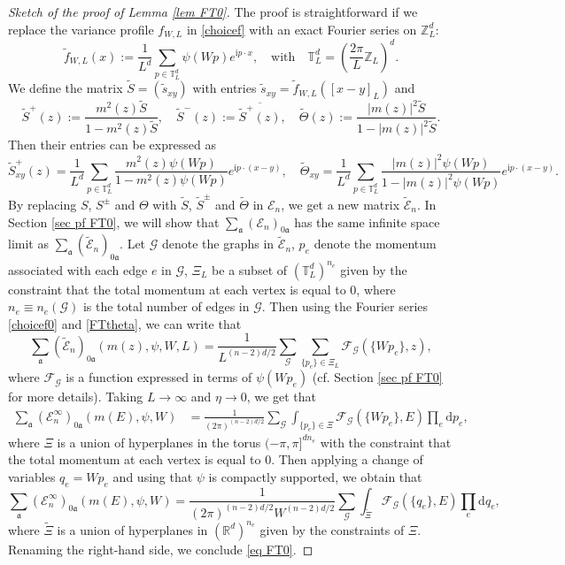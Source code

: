 \documentclass{article}
\newcommand{\1}{\mathds{1}}
\numberwithin{equation}{section}
\newcommand{\be}{\begin{equation}}
\newcommand{\ee}{\end{equation}}
\newcommand{\fa}{{\mathfrak a}}
\renewcommand{\cal}{\mathcal}
\newcommand{\wt}{\widetilde}
\newcommand{\ii}{\mathrm{i}} %
\newcommand{\dd}{\mathrm{d}}
\newcommand{\R}{\mathbb{R}}
\newcommand{\Z}{\mathbb{Z}}
\theoremstyle{plain} %
\theoremstyle{remark}
\newcommand{\cor}{\color{red}}
\newcommand{\Sele}{{\mathcal E}}
\newcommand{\Seleinf}{{\mathcal E}^{\infty}}
\newcommand{\hty}[1]{{\cor (ht: #1) }}
\begin{document}
\begin{proof}[Sketch of the proof of Lemma \ref{lem FT0}]
The proof is straightforward if we replace the variance profile $f_{W,L}$ in \eqref{choicef} with an exact Fourier series on $\Z_L^d$:
\be\label{choicef0}
\wt f_{W,L}(x):= \frac1{L^d}\sum_{p\in \mathbb T_L^d} \psi(Wp)e^{\ii p\cdot x}, \quad \text{with}\quad \mathbb T_L^d =\left(\frac{2\pi }{L}\Z_L\right)^d.  \ee
We define the matrix $\wt S=(\wt s_{xy})$ with entries $\wt s_{xy}= \wt f_{W,L}([x-y]_L)$ and %
\be\label{choicefS}\wt S^+(z):=\frac{m^2(z)\wt S}{1-m^2(z)\wt S}, \quad \wt S^-(z):=\overline{\wt S^+(z)},\quad \wt \Theta(z):=\frac{|m(z)|^2 \wt S}{1-|m(z)|^2\wt S}.\ee
Then their entries can be expressed as 
\be\label{FTtheta}
\wt S^{+}_{xy}(z) = \frac1{L^d}\sum_{p\in \mathbb T_L^d} \frac{ m^2(z)\psi(Wp)}{1-m^2(z)\psi(Wp)}e^{\ii p\cdot (x-y)} ,\quad \wt \Theta_{xy}  =  \frac1{L^d}\sum_{p\in \mathbb T_L^d}\frac{|m(z)|^2  \psi(Wp)}{1- |m(z)|^2 \psi(Wp)}e^{\ii p\cdot (x-y)} .
\ee
By replacing $ S$, $ S^\pm$ and $ \Theta$ with $\wt S$, $\wt S^\pm$ and $\wt\Theta$ in $\Sele_n$, we get a new matrix $\wt\Sele_n$.  
In Section \ref{sec pf FT0}, we will show that $\sum_{\fa}(\Sele_n)_{ 0\fa}$ has the same infinite space limit as $\sum_{\fa}(\wt \Sele_n)_{ 0\fa}$. Let $\cal G$ denote the graphs in $\wt\Sele_{n}$, $p_e$ denote the momentum associated with each edge $e$ in $\cal G$, $\Xi_L$ be a subset of $(\mathbb T_L^{d})^{n_e}$ given by the constraint that the total momentum at each vertex is equal to 0, where $n_e\equiv n_e(\cal G)$ is the total number of edges in $\cal G$. Then using the Fourier series \eqref{choicef0} and \eqref{FTtheta}, we can write that
$$\sum_{\fa} (\wt\Sele_{n})_{0\fa}(m(z),\psi,W,L)=\frac{1}{L^{(n-2) d/2 }}\sum_{\cal G}\sum_{ \{p_e\} \in \Xi_{L}}\cal F_{\cal G}\left( \{Wp_e\},z\right), $$
where $\cal F_{\cal G}$ is a function expressed in terms of $\psi(Wp_e)$ (cf. Section \ref{sec pf FT0} for more details). 
Taking $L\to \infty$ and $\eta \to 0$, we get that
\begin{align*} 
\sum_{\fa} (\Seleinf_{n})_{0\fa } (m(E), \psi, W) &=\frac{1}{(2\pi)^{(n-2) d/2}}\sum_{\cal G}\int_{ \{p_e\} \in \Xi} \cal F_{\cal G}\left( \{Wp_e\},E\right) \prod_e \dd p_e ,
\end{align*}
where $\Xi$ is a union of hyperplanes in the torus $(-\pi,\pi]^{d n_e}$ with the  constraint that the total momentum at each vertex is equal to 0. Then applying a change of variables $q_e=Wp_e$ and using that $\psi$ is compactly supported, we obtain that 
$$\sum_{\fa} (\Seleinf_{n})_{ 0\fa }(m(E), \psi, W) =\frac{1}{(2\pi)^{(n-2) d/2}W^{(n-2) d/2}}\sum_{\cal G}\int_{\wt\Xi} \cal F_{\cal G}\left( \{q_e\},E\right) \prod_e \dd q_e,$$
where $\wt\Xi$ is a union of hyperplanes in $(\R^d)^{n_e}$ given by the constraints of $\Xi$. Renaming the right-hand side, we conclude \eqref{eq FT0}. 
\end{proof}
 
\end{document}
